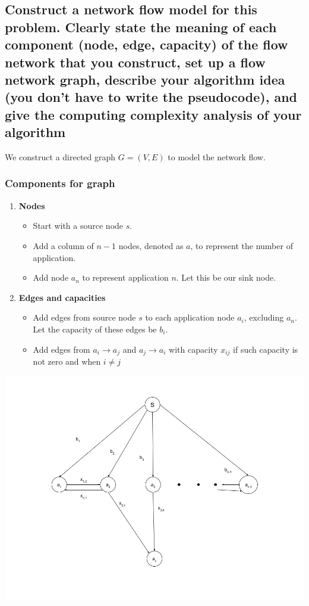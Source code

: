 \documentclass[11pt]{scrartcl}
\begin{document}
	\subsection{
		Construct a network flow model for this problem. Clearly state the meaning of
		each component (node, edge, capacity) of the flow network that you construct, set up a flow
		network graph, describe your algorithm idea (you don’t have to write the pseudocode), and
		give the computing complexity analysis of your algorithm
	}
	We construct a directed graph $G=(V,E)$ to model the network flow.
	\subsubsection{
		Components for graph
	}
	\begin{enumerate}[label=\alph*.]
		\item{
		      \textbf{Nodes}
		      \begin{itemize}
			      \item Start with a source node $s$.
			      \item Add a column of $n-1$ nodes, denoted as $a$, to represent the number of application.
			      \item Add node $a_n$ to represent application $n$. Let this be our sink node.
		      \end{itemize}
		      }
		\item{
		      \textbf{Edges and capacities}
		      \begin{itemize}
			      \item{
			            Add edges from source node $s$ to each application node $a_i$, excluding $a_n$. Let the capacity of these edges be $b_i$.
			            }
			      \item {
						Add edges from $a_i \rightarrow a_j$ and $a_j \rightarrow a_i$ with capacity $x_{ij}$ if such capacity is not zero and
						when $i \neq j$
			            }
		      \end{itemize}
		      }
	\end{enumerate}
	\begin{center}
		\includegraphics[scale=0.4]{final.png}
	\end{center}
\end{document}
